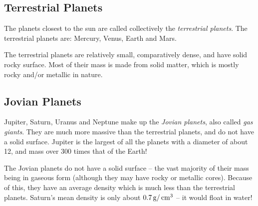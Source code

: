 \subsection{Terrestrial Planets}%

The planets closest to the sun are called collectively the
\emph{terrestrial planets}. The terrestrial planets are: Mercury, Venus,
Earth and Mars.

The terrestrial planets are relatively small, comparatively dense, and
have solid rocky surface. Most of their mass is made from solid matter,
which is mostly rocky and/or metallic in nature.

\subsection{Jovian Planets}%

Jupiter, Saturn, Uranus and Neptune make up the \emph{Jovian planets},
also called \emph{gas giants}. They are much more massive than the
terrestrial planets, and do not have a solid surface. Jupiter is the
largest of all the planets with a diameter of about 12, and mass over
300 times that of the Earth!

The Jovian planets do not have a solid surface -- the vast majority of
their mass being in gaseous form (although they may have rocky or
metallic cores). Because of this, they have an average density which is
much less than the terrestrial planets. Saturn's mean density is only
about $0.7 \,\mathrm{g}/\,\mathrm{cm}^3$ -- it would float in water!

